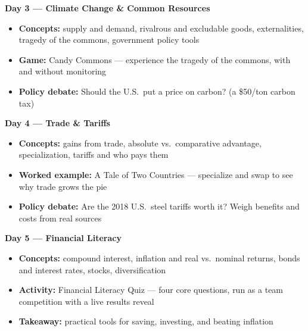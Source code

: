 \documentclass[letterpaper,10pt]{article}
\begin{document}
\vspace{0.6em}

\noindent\textbf{Day 3 --- Climate Change \& Common Resources}
\begin{itemize}
  \item \textbf{Concepts:} supply and demand, rivalrous and excludable goods, externalities, tragedy of the commons, government policy tools
  \item \textbf{Game:} Candy Commons --- experience the tragedy of the commons, with and without monitoring
  \item \textbf{Policy debate:} Should the U.S.\ put a price on carbon? (a \$50/ton carbon tax)
\end{itemize}

\vspace{0.6em}

\noindent\textbf{Day 4 --- Trade \& Tariffs}
\begin{itemize}
  \item \textbf{Concepts:} gains from trade, absolute vs.\ comparative advantage, specialization, tariffs and who pays them
  \item \textbf{Worked example:} A Tale of Two Countries --- specialize and swap to see why trade grows the pie
  \item \textbf{Policy debate:} Are the 2018 U.S.\ steel tariffs worth it? Weigh benefits and costs from real sources
\end{itemize}

\vspace{0.6em}

\noindent\textbf{Day 5 --- Financial Literacy}
\begin{itemize}
  \item \textbf{Concepts:} compound interest, inflation and real vs.\ nominal returns, bonds and interest rates, stocks, diversification
  \item \textbf{Activity:} Financial Literacy Quiz --- four core questions, run as a team competition with a live results reveal
  \item \textbf{Takeaway:} practical tools for saving, investing, and beating inflation
\end{itemize}
\end{document}
